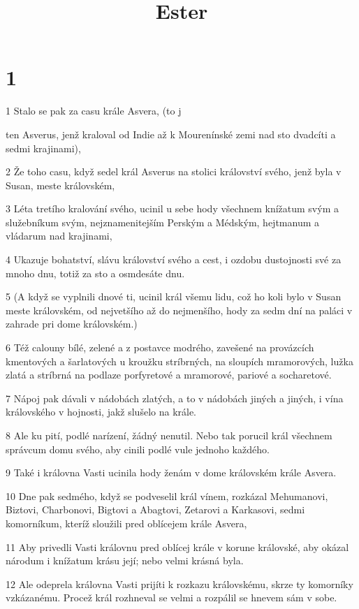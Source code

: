 

\title{Ester}

\chapter{1}

\par 1 Stalo se pak za casu krále Asvera, (to j\par ten Asverus, jenž kraloval od Indie až k Mourenínské zemi nad sto dvadcíti a sedmi krajinami),
\par 2 Že toho casu, když sedel král Asverus na stolici království svého, jenž byla v Susan, meste královském,
\par 3 Léta tretího kralování svého, ucinil u sebe hody všechnem knížatum svým a služebníkum svým, nejznamenitejším Perským a Médským, hejtmanum a vládarum nad krajinami,
\par 4 Ukazuje bohatství, slávu království svého a cest, i ozdobu dustojnosti své za mnoho dnu, totiž za sto a osmdesáte dnu.
\par 5 (A když se vyplnili dnové ti, ucinil král všemu lidu, což ho koli bylo v Susan meste královském, od nejvetšího až do nejmenšího, hody za sedm dní na paláci v zahrade pri dome královském.)
\par 6 Též calouny bílé, zelené a z postavce modrého, zavešené na provázcích kmentových a šarlatových u kroužku stríbrných, na sloupích mramorových, lužka zlatá a stríbrná na podlaze porfyretové a mramorové, pariové a socharetové.
\par 7 Nápoj pak dávali v nádobách zlatých, a to v nádobách jiných a jiných, i vína královského v hojnosti, jakž slušelo na krále.
\par 8 Ale ku pití, podlé narízení, žádný nenutil. Nebo tak porucil král všechnem správcum domu svého, aby cinili podlé vule jednoho každého.
\par 9 Také i královna Vasti ucinila hody ženám v dome královském krále Asvera.
\par 10 Dne pak sedmého, když se podveselil král vínem, rozkázal Mehumanovi, Biztovi, Charbonovi, Bigtovi a Abagtovi, Zetarovi a Karkasovi, sedmi komorníkum, kteríž sloužili pred oblícejem krále Asvera,
\par 11 Aby privedli Vasti královnu pred oblícej krále v korune královské, aby okázal národum i knížatum krásu její; nebo velmi krásná byla.
\par 12 Ale odeprela královna Vasti prijíti k rozkazu královskému, skrze ty komorníky vzkázanému. Procež král rozhneval se velmi a rozpálil se hnevem sám v sobe.
